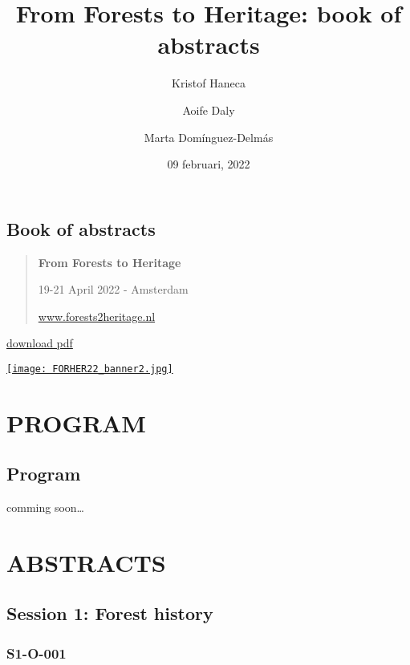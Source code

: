 \documentclass[
]{book}
\title{From Forests to Heritage: book of abstracts}
\author{Kristof Haneca \and Aoife Daly \and Marta Domínguez-Delmás}
\date{09 februari, 2022}
\begin{document}
\maketitle

{
\setcounter{tocdepth}{1}
\tableofcontents
}
\hypertarget{book-of-abstracts}{%
\chapter*{Book of abstracts}\label{book-of-abstracts}}

\begin{quote}
\textbf{From Forests to Heritage}

19-21 April 2022 - Amsterdam

\url{www.forests2heritage.nl}
\end{quote}

\href{./docs/forests2heritage.pdf}{download pdf}

\href{https://event.forests2heritage.nl/}{\texttt{[image: FORHER22\_banner2.jpg]}}

\hypertarget{part-program}{%
\part*{PROGRAM}\label{part-program}}

\hypertarget{program}{%
\chapter*{Program}\label{program}}

comming soon\ldots{}

\hypertarget{part-abstracts}{%
\part*{ABSTRACTS}\label{part-abstracts}}

\hypertarget{session-1-forest-history}{%
\chapter*{Session 1: Forest history}\label{session-1-forest-history}}

\hypertarget{s1-o-001}{%
\section*{S1-O-001}\label{s1-o-001}}
\end{document}
